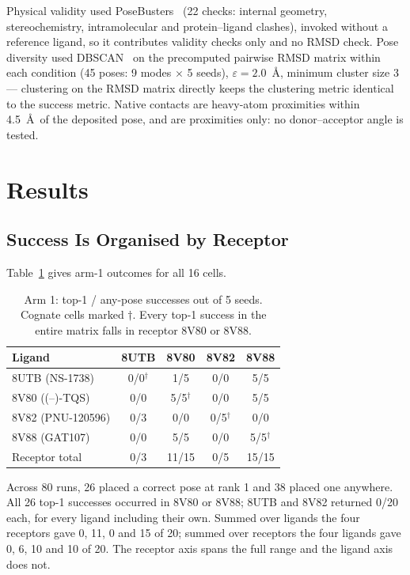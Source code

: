 \documentclass[sigconf]{acmart}
\begin{document}
Physical validity used PoseBusters~\cite{buttenschoen2024} (22 checks: internal
geometry, stereochemistry, intramolecular and protein--ligand clashes), invoked
without a reference ligand, so it contributes validity checks only and no RMSD
check. Pose diversity used DBSCAN~\cite{ester1996} on the precomputed pairwise
RMSD matrix within each condition (45 poses: 9 modes $\times$ 5 seeds),
$\varepsilon = 2.0$~\AA, minimum cluster size 3 --- clustering on the RMSD matrix
directly keeps the clustering metric identical to the success metric. Native
contacts are heavy-atom proximities within 4.5~\AA\ of the deposited pose, and are
proximities only: no donor--acceptor angle is tested.

\section{Results}

\subsection{Success Is Organised by Receptor}

Table~\ref{tab:matrix} gives arm-1 outcomes for all 16 cells.

\begin{table}[h!]
\caption{Arm 1: top-1 / any-pose successes out of 5 seeds. Cognate cells marked
$\dagger$. Every top-1 success in the entire matrix falls in receptor 8V80 or
8V88.}
\label{tab:matrix}
\begin{center}
\begin{tabular}{l|c|c|c|c}
\hline
Ligand & 8UTB & 8V80 & 8V82 & 8V88 \\ \hline
8UTB (NS-1738)    & 0/0$^\dagger$ & 1/5 & 0/0 & 5/5 \\ \hline
8V80 ((--)-TQS)   & 0/0 & 5/5$^\dagger$ & 0/0 & 5/5 \\ \hline
8V82 (PNU-120596) & 0/3 & 0/0 & 0/5$^\dagger$ & 0/0 \\ \hline
8V88 (GAT107)     & 0/0 & 5/5 & 0/0 & 5/5$^\dagger$ \\ \hline
Receptor total    & 0/3 & 11/15 & 0/5 & 15/15 \\ \hline
\end{tabular}
\end{center}
\end{table}

Across 80 runs, 26 placed a correct pose at rank 1 and 38 placed one anywhere.
All 26 top-1 successes occurred in 8V80 or 8V88; 8UTB and 8V82 returned 0/20 each,
for every ligand including their own. Summed over ligands the four receptors gave
0, 11, 0 and 15 of 20; summed over receptors the four ligands gave 0, 6, 10 and 10
of 20. The receptor axis spans the full range and the ligand axis does not.
\end{document}
